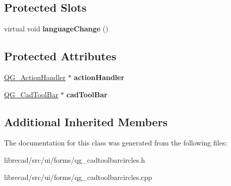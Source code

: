 \subsection*{Protected Slots}
\begin{DoxyCompactItemize}
\item 
\hypertarget{classQG__CadToolBarCircles_aba949114b60c51a7fcfcf36c180ef88f}{virtual void {\bfseries language\-Change} ()}\label{classQG__CadToolBarCircles_aba949114b60c51a7fcfcf36c180ef88f}

\end{DoxyCompactItemize}
\subsection*{Protected Attributes}
\begin{DoxyCompactItemize}
\item 
\hypertarget{classQG__CadToolBarCircles_a3f25674eb37e28cf3323f4290a6916b2}{\hyperlink{classQG__ActionHandler}{Q\-G\-\_\-\-Action\-Handler} $\ast$ {\bfseries action\-Handler}}\label{classQG__CadToolBarCircles_a3f25674eb37e28cf3323f4290a6916b2}

\item 
\hypertarget{classQG__CadToolBarCircles_adce12801cfea5cea44c57a04d4bbc4b3}{\hyperlink{classQG__CadToolBar}{Q\-G\-\_\-\-Cad\-Tool\-Bar} $\ast$ {\bfseries cad\-Tool\-Bar}}\label{classQG__CadToolBarCircles_adce12801cfea5cea44c57a04d4bbc4b3}

\end{DoxyCompactItemize}
\subsection*{Additional Inherited Members}


The documentation for this class was generated from the following files\-:\begin{DoxyCompactItemize}
\item 
librecad/src/ui/forms/qg\-\_\-cadtoolbarcircles.\-h\item 
librecad/src/ui/forms/qg\-\_\-cadtoolbarcircles.\-cpp\end{DoxyCompactItemize}
